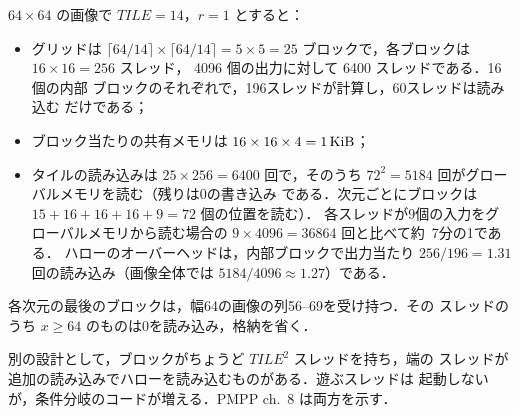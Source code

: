 \documentclass[../main.tex]{subfiles}
\begin{document}
\begin{example}
  \label{ex:l03-stencil-count}
  $64\times64$ の画像で $\mathit{TILE}=14$，$r=1$ とすると：
  \begin{itemize}
    \item グリッドは $\lceil 64/14 \rceil \times \lceil 64/14 \rceil = 5\times5
      = 25$ ブロックで，各ブロックは $16\times16 = 256$ スレッド，
      \num{4096} 個の出力に対して \num{6400} スレッドである．16個の内部
      ブロックのそれぞれで，196スレッドが計算し，60スレッドは読み込む
      だけである；
    \item ブロック当たりの共有メモリは $16 \times 16 \times 4 =
      \SI{1}{\kibi\byte}$；
    \item タイルの読み込みは $25 \times 256 = \num{6400}$ 回で，そのうち
      $72^2 = \num{5184}$ 回がグローバルメモリを読む（残りは0の書き込み
      である．次元ごとにブロックは $15+16+16+16+9 = 72$ 個の位置を読む）．
      各スレッドが9個の入力をグローバルメモリから読む場合の
      $9 \times \num{4096} = \num{36864}$ 回と比べて約~7分の1である．
      ハローのオーバーヘッドは，内部ブロックで出力当たり
      $256/196 = 1.31$ 回の読み込み（画像全体では
      $\num{5184}/\num{4096} \approx 1.27$）である．
  \end{itemize}
  各次元の最後のブロックは，幅64の画像の列56--69を受け持つ．その
  スレッドのうち $x \ge 64$ のものは0を読み込み，格納を省く．
\end{example}


別の設計として，ブロックがちょうど $\mathit{TILE}^2$ スレッドを持ち，端の
スレッドが追加の読み込みでハローを読み込むものがある．遊ぶスレッドは
起動しないが，条件分岐のコードが増える．PMPP ch.~8 は両方を示す．
\end{document}
